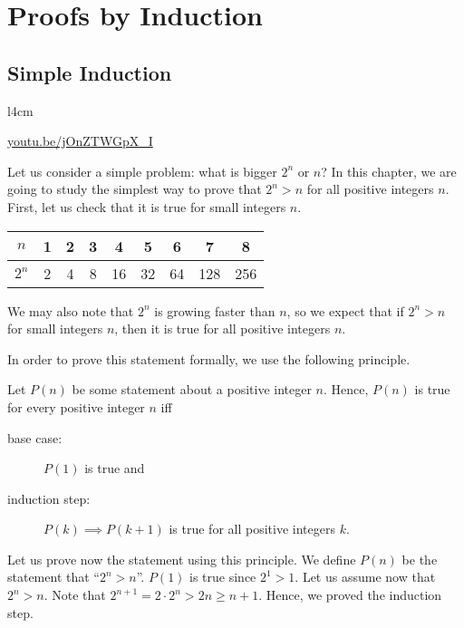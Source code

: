 \chapter{Proofs by Induction}
\section{Simple Induction}
\begin{wrapfigure}{l}{4cm}
  \begin{center}
    \vskip -0.5cm
    \vskip 0.25cm
    \href{https://youtu.be/jOnZTWGpX_I}{youtu.be/jOnZTWGpX\_I}
  \end{center}
  \vskip -1.5cm
\end{wrapfigure}
Let us consider a simple problem: what is bigger $2^n$ or $n$? In this chapter,
we are going to study the simplest way to prove that $2^n > n$ for all positive
integers $n$. First, let us check that it is true for small integers $n$.
\begin{flushright}
  \begin{tabular}{c | c | c | c | c | c | c | c | c}
    $n$   & 1 & 2 & 3 & 4  & 5  & 6  & 7   & 8   \\
    \hline
    $2^n$ & 2 & 4 & 8 & 16 & 32 & 64 & 128 & 256
  \end{tabular}
\end{flushright}
We may also note that $2^n$ is growing faster than $n$, so we expect that if
$2^n > n$ for small integers $n$, then it is true for all positive integers $n$.

In order to prove this statement formally, we use the following principle.
\begin{principle}
  Let $P(n)$ be some statement about a positive integer $n$.
  Hence, $P(n)$ is true for every positive integer $n$ iff
  \begin{description}
    \item[base case:] $P(1)$ is true and
    \item[induction step:] $P(k) \implies P(k + 1)$ is true for all positive
      integers $k$.
  \end{description}
\end{principle}

Let us prove now the statement using this principle.
We define $P(n)$ be the statement that ``$2^n > n$''.
$P(1)$ is true since $2^1 > 1$. Let us assume now that $2^n > n$. Note that
$2^{n + 1} = 2 \cdot 2^n > 2n \ge n + 1$. Hence, we proved the induction step.

